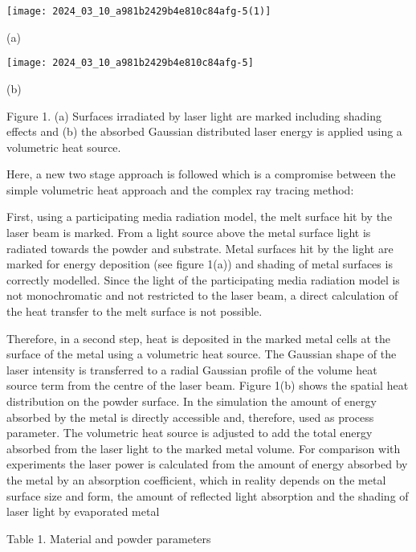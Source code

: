 \documentclass[10pt]{article}
\begin{document}
\begin{center}
\texttt{[image: 2024\_03\_10\_a981b2429b4e810c84afg-5(1)]}
\end{center}

(a)

\begin{center}
\texttt{[image: 2024\_03\_10\_a981b2429b4e810c84afg-5]}
\end{center}

(b)

Figure 1. (a) Surfaces irradiated by laser light are marked including shading effects and (b) the absorbed Gaussian distributed laser energy is applied using a volumetric heat source.

Here, a new two stage approach is followed which is a compromise between the simple volumetric heat approach and the complex ray tracing method:

First, using a participating media radiation model, the melt surface hit by the laser beam is marked. From a light source above the metal surface light is radiated towards the powder and substrate. Metal surfaces hit by the light are marked for energy deposition (see figure 1(a)) and shading of metal surfaces is correctly modelled. Since the light of the participating media radiation model is not monochromatic and not restricted to the laser beam, a direct calculation of the heat transfer to the melt surface is not possible.

Therefore, in a second step, heat is deposited in the marked metal cells at the surface of the metal using a volumetric heat source. The Gaussian shape of the laser intensity is transferred to a radial Gaussian profile of the volume heat source term from the centre of the laser beam. Figure 1(b) shows the spatial heat distribution on the powder surface. In the simulation the amount of energy absorbed by the metal is directly accessible and, therefore, used as process parameter. The volumetric heat source is adjusted to add the total energy absorbed from the laser light to the marked metal volume. For comparison with experiments the laser power is calculated from the amount of energy absorbed by the metal by an absorption coefficient, which in reality depends on the metal surface size and form, the amount of reflected light absorption and the shading of laser light by evaporated metal

Table 1. Material and powder parameters
\end{document}
